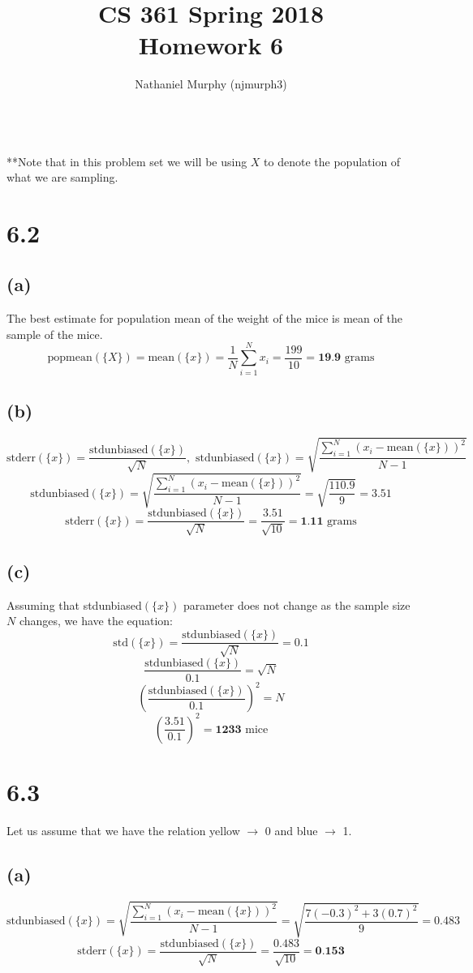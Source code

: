 \documentclass[11pt]{article}
\title{\textbf{CS 361 Spring 2018\\Homework 6}}
\author{Nathaniel Murphy (njmurph3)}
\date{}
\begin{document}
\maketitle
\ \\
**Note that in this problem set we will be using $X$ to denote the population of what we are sampling. \\
\section*{6.2}
\subsection*{(a)}
The best estimate for population mean of the weight of the mice is mean of the sample of the mice.
\[\text{popmean}(\{X\})=\text{mean}(\{x\})=\frac{1}{N}\sum_{i=1}^Nx_i=\frac{199}{10}=\textbf{19.9}\text{ grams}\]
\subsection*{(b)}
\[\text{stderr}(\{x\})=\frac{\text{stdunbiased}(\{x\})}{\sqrt{N}},\text{ stdunbiased}(\{x\})=\sqrt{\frac{\sum_{i=1}^N(x_i-\text{mean}(\{x\}))^2}{N-1}}\]
\[\text{stdunbiased}(\{x\})=\sqrt{\frac{\sum_{i=1}^N(x_i-\text{mean}(\{x\}))^2}{N-1}}=\sqrt{\frac{110.9}{9}}=3.51\]
\[\text{stderr}(\{x\})=\frac{\text{stdunbiased}(\{x\})}{\sqrt{N}}=\frac{3.51}{\sqrt{10}}=\textbf{1.11}\text{ grams}\]
\subsection*{(c)}
Assuming that stdunbiased$(\{x\})$ parameter does not change as the sample size $N$ changes, we have the equation:
\[\text{std}(\{x\})=\frac{\text{stdunbiased}(\{x\})}{\sqrt{N}}=0.1\]
\[\frac{\text{stdunbiased}(\{x\})}{0.1}=\sqrt{N}\]
\[\left(\frac{\text{stdunbiased}(\{x\})}{0.1}\right)^2=N\]
\[\left(\frac{3.51}{0.1}\right)^2=\textbf{1233}\text{ mice}\]
\clearpage
\section*{6.3}
Let us assume that we have the relation yellow $\rightarrow$ 0 and blue $\rightarrow$ 1.
\subsection*{(a)}
\[\text{stdunbiased}(\{x\})=\sqrt{\frac{\sum_{i=1}^N(x_i-\text{mean}(\{x\}))^2}{N-1}}=\sqrt{\frac{7(-0.3)^2+3(0.7)^2}{9}}=0.483\]
\[\text{stderr}(\{x\})=\frac{\text{stdunbiased}(\{x\})}{\sqrt{N}}=\frac{0.483}{\sqrt{10}}=\textbf{0.153}\]
\end{document}
